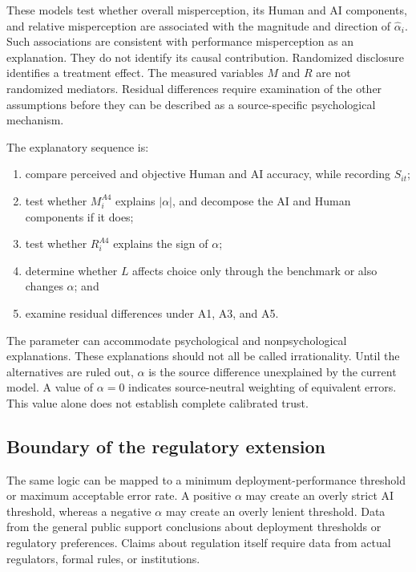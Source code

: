 \documentclass[11pt,a4paper]{article}
\begin{document}
These models test whether overall misperception, its Human and AI components, and relative misperception are associated with the magnitude and direction of $\widehat\alpha_i$. Such associations are consistent with performance misperception as an explanation. They do not identify its causal contribution. Randomized disclosure identifies a treatment effect. The measured variables $M$ and $R$ are not randomized mediators. Residual differences require examination of the other assumptions before they can be described as a source-specific psychological mechanism.

The explanatory sequence is:

\begin{enumerate}
\item compare perceived and objective Human and AI accuracy, while recording $S_{it}$;
\item test whether $M_i^{A4}$ explains $|\alpha|$, and decompose the AI and Human components if it does;
\item test whether $R_i^{A4}$ explains the sign of $\alpha$;
\item determine whether $L$ affects choice only through the benchmark or also changes $\alpha$; and
\item examine residual differences under A1, A3, and A5.
\end{enumerate}

The parameter can accommodate psychological and nonpsychological explanations. These explanations should not all be called irrationality. Until the alternatives are ruled out, $\alpha$ is the source difference unexplained by the current model. A value of $\alpha=0$ indicates source-neutral weighting of equivalent errors. This value alone does not establish complete calibrated trust.

\subsection{Boundary of the regulatory extension}

The same logic can be mapped to a minimum deployment-performance threshold or maximum acceptable error rate. A positive $\alpha$ may create an overly strict AI threshold, whereas a negative $\alpha$ may create an overly lenient threshold. Data from the general public support conclusions about deployment thresholds or regulatory preferences. Claims about regulation itself require data from actual regulators, formal rules, or institutions.
\end{document}
